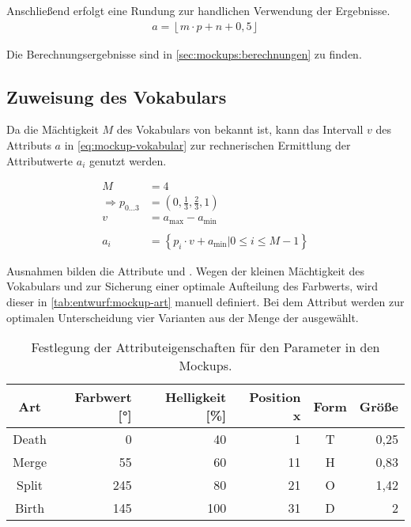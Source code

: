 Anschließend erfolgt eine Rundung zur handlichen Verwendung der Ergebnisse.
\begin{align}\label{eq:mockup-rundung}
	a = \left\lfloor m \cdot p + n + 0,5 \right\rfloor
\end{align}

Die Berechnungsergebnisse sind in \autoref{sec:mockups:berechnungen} zu finden.

\subsection{Zuweisung des Vokabulars}

Da die Mächtigkeit $M$ des Vokabulars von  bekannt ist, kann das Intervall $v$ des Attributs $a$ in \autoref{eq:mockup-vokabular} zur rechnerischen Ermittlung der Attributwerte $a_i$ genutzt werden.

\begin{equation}
\begin{aligned}\label{eq:mockup-vokabular}
M &= 4\\
\Rightarrow p_{0\ldots 3} &= \left( 0, \frac 13, \frac 23, 1 \right) \\
v &= a_{\text{max}} - a_{\text{min}}\\
\\
a_i &= \left\lbrace p_i \cdot v + a_{\text{min}} \left| 0 \le i \le M-1 \right. \right\rbrace 
\end{aligned}
\end{equation}

Ausnahmen bilden die Attribute  und . Wegen der kleinen Mächtigkeit des Vokabulars und zur Sicherung einer optimale Aufteilung des Farbwerts, wird dieser in \autoref{tab:entwurf:mockup-art} manuell definiert. Bei dem Attribut  werden zur optimalen Unterscheidung vier Varianten aus der Menge der  ausgewählt.

\begin{table}
	\begin{tabularx}{\textwidth}{@{}CRRRCR@{}}
		\toprule
		Art & Farbwert [°] & Helligkeit [\%] & Position x & Form & Größe \tabularnewline
		\midrule
		Death & 0   & 40  & 1  & T & 0,25 \tabularnewline
		Merge & 55  & 60  & 11 & H & 0,83 \tabularnewline
		Split & 245 & 80  & 21 & O & 1,42 \tabularnewline
		Birth & 145 & 100 & 31 & D & 2 \tabularnewline
		\bottomrule
	\end{tabularx}
	\caption{Festlegung der Attributeigenschaften für den Parameter  in den Mockups.}\label{tab:entwurf:mockup-art}
\end{table}

